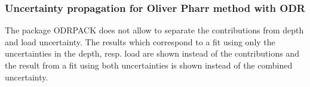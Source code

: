 

\subsubsection{Uncertainty propagation for Oliver Pharr method with ODR} \label{opodr_unc}
The package ODRPACK does not allow to separate the contributions from depth and load uncertainty. 
The results which correspond to a fit using only the uncertainties in the depth, resp. load are shown instead of the contributions and 
the result from a fit using both uncertainties is shown instead of the combined uncertainty.
